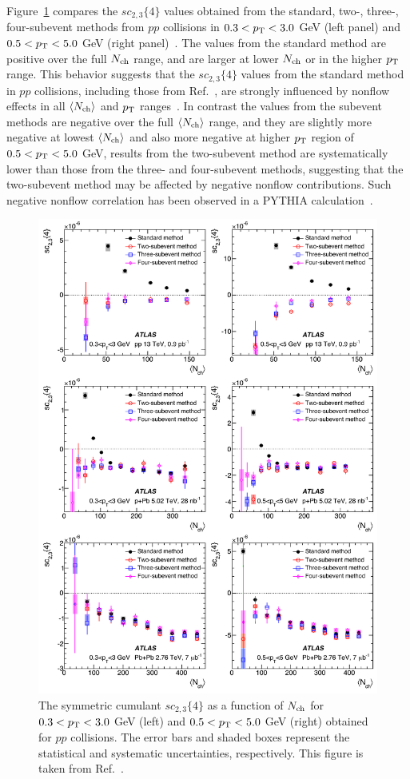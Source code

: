 Figure~\ref{fig:subcumu_ATLAS_sc23_pp} compares the $sc_{2,3}\{4\}$ values obtained from the standard, two-, three-, four-subevent methods from $pp$ collisions in $0.3<p_\text{T}<3.0$ GeV (left panel) and $0.5<p_\text{T}<5.0$ GeV (right panel)~\cite{Aaboud:2018syf}. The values from the standard method are positive over the full $N_\text{ch}$ range, and are larger at lower $N_\text{ch}$ or in the higher $p_\text{T}$ range. This behavior suggests that the $sc_{2,3}\{4\}$ values from the standard method in $pp$ collisions, including those from Ref.~\cite{Sirunyan:2017uyl}, are strongly influenced by nonflow effects in all $\left\langle N_\text{ch}\right\rangle$ and $p_\text{T}$ ranges~\cite{Huo:2017nms}. In contrast the values from the subevent methods are negative over the full $\left\langle N_\text{ch}\right\rangle$ range, and they are slightly more negative at lowest $\left\langle N_\text{ch}\right\rangle$ and also more negative at higher $p_\text{T}$ region of $0.5<p_\text{T}<5.0$ GeV, results from the two-subevent method are systematically lower than those from the three- and four-subevent methods, suggesting that the two-subevent method may be affected by negative nonflow contributions. Such negative nonflow correlation has been observed in a PYTHIA calculation~\cite{Huo:2017nms}.

\begin{figure}[H]
\centering
\includegraphics[width=.95\linewidth]{figs/chapter_subcumu/ATLAS_sc23_pp.pdf}
\caption{The symmetric cumulant $sc_{2,3}\{4\}$ as a function of $N_\text{ch}$ for $0.3<p_\text{T}<3.0$ GeV (left) and $0.5<p_\text{T}<5.0$ GeV (right) obtained for $pp$ collisions. The error bars and shaded boxes represent the statistical and systematic uncertainties, respectively. This figure is taken from Ref.~\cite{Aaboud:2018syf}.}
\label{fig:subcumu_ATLAS_sc23_pp}
\end{figure}

